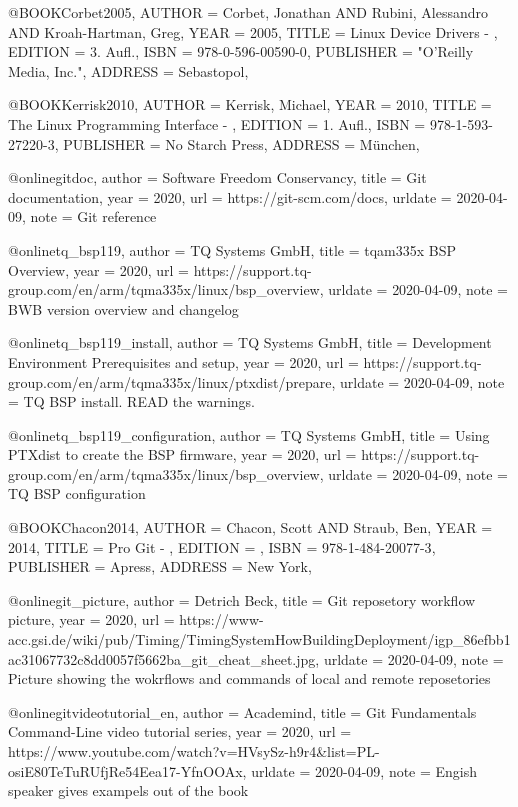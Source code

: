 @BOOK{Corbet2005,
	AUTHOR = {Corbet, Jonathan AND Rubini, Alessandro AND Kroah-Hartman, Greg},
	YEAR = {2005},
	TITLE = {Linux Device Drivers - },
	EDITION = {3. Aufl.},
	ISBN = {978-0-596-00590-0},
	PUBLISHER = {"O'Reilly Media, Inc."},
	ADDRESS = {Sebastopol},
}

@BOOK{Kerrisk2010,
	AUTHOR = {Kerrisk, Michael},
	YEAR = {2010},
	TITLE = {The Linux Programming Interface - },
	EDITION = {1. Aufl.},
	ISBN = {978-1-593-27220-3},
	PUBLISHER = {No Starch Press},
	ADDRESS = {München},
}



@online{gitdoc,
author = {Software Freedom Conservancy},
title = {Git documentation},
year = 2020,
url = {https://git-scm.com/docs},
urldate = {2020-04-09},
note = {Git reference}
}

@online{tq_bsp119,
author = {TQ Systems GmbH},
title = {tqam335x BSP Overview},
year = 2020,
url = {https://support.tq-group.com/en/arm/tqma335x/linux/bsp_overview},
urldate = {2020-04-09},
note = {BWB version overview and changelog}
}

@online{tq_bsp119_install,
author = {TQ Systems GmbH},
title = {Development Environment Prerequisites and setup},
year = 2020,
url = {https://support.tq-group.com/en/arm/tqma335x/linux/ptxdist/prepare},
urldate = {2020-04-09},
note = {TQ BSP install. READ the warnings.}
}

@online{tq_bsp119_configuration,
author = {TQ Systems GmbH},
title = {Using PTXdist to create the BSP firmware},
year = 2020,
url = {https://support.tq-group.com/en/arm/tqma335x/linux/bsp_overview},
urldate = {2020-04-09},
note = {TQ BSP configuration}
}

@BOOK{Chacon2014,
	AUTHOR = {Chacon, Scott AND Straub, Ben},
	YEAR = {2014},
	TITLE = {Pro Git - },
	EDITION = {},
	ISBN = {978-1-484-20077-3},
	PUBLISHER = {Apress},
	ADDRESS = {New York},
}

@online{git_picture,
author = {Detrich Beck},
title = {Git reposetory workflow picture},
year = 2020,
url =
{https://www-acc.gsi.de/wiki/pub/Timing/TimingSystemHowBuildingDeployment/igp_86efbb1ac31067732c8dd0057f5662ba_git_cheat_sheet.jpg},
urldate = {2020-04-09},
note = {Picture showing the wokrflows and commands of local and remote
    reposetories}
}

@online{gitvideotutorial_en,
author = {Academind},
title = {Git Fundamentals Command-Line video tutorial series},
year = 2020,
url = {https://www.youtube.com/watch?v=HVsySz-h9r4&list=PL-osiE80TeTuRUfjRe54Eea17-YfnOOAx},
urldate = {2020-04-09},
note = {Engish speaker gives exampels out of the book~\cite{Chacon2014}}
}


